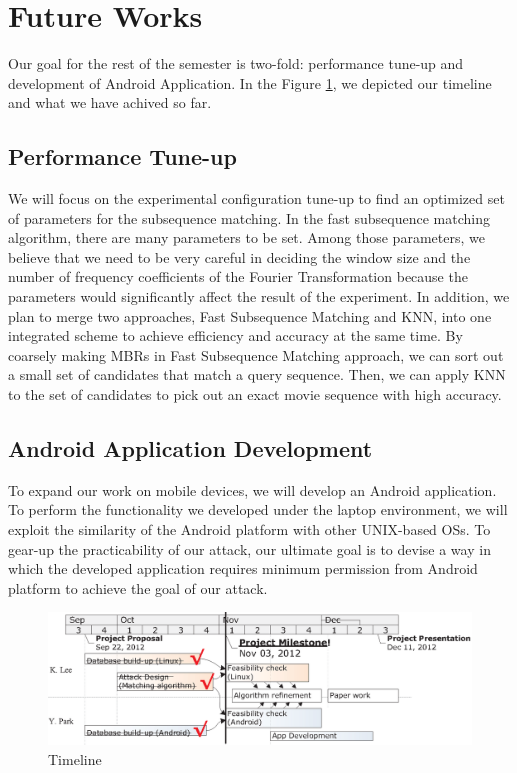\section{Future Works}
\label{sec:future}
Our goal for the rest of the semester is two-fold: performance tune-up and development of Android Application. In the Figure \ref{fig:timeline}, we depicted our timeline and what we have achived so far.
\subsection{Performance Tune-up}
We will focus on the experimental configuration tune-up to find an optimized set of parameters for the subsequence matching. In the fast subsequence matching algorithm, there are many parameters to be set. Among those parameters, we believe that we need to be very careful in deciding the window size and the number of frequency coefficients of the Fourier Transformation because the parameters would significantly affect the result of the experiment.
In addition, we plan to merge two approaches, Fast Subsequence Matching and KNN, into one integrated scheme to achieve efficiency and accuracy at the same time. By coarsely making MBRs in Fast Subsequence Matching approach, we can sort out a small set of candidates that match a query sequence. Then, we can apply KNN to the set of candidates to pick out an exact movie sequence with high accuracy.
\subsection{Android Application Development}
To expand our work on mobile devices, we will develop an Android application. To perform the functionality we developed under the laptop environment, we will exploit the similarity of the Android platform with other UNIX-based OSs. To gear-up the practicability of our attack, our ultimate goal is to devise a way in which the developed application requires minimum permission from Android platform to achieve the goal of our attack.
\begin{figure}[!hb]
\centering
\includegraphics{Figures/Timeline_Mile}
\caption{Timeline}
\label{fig:timeline}
\vspace{-5mm}
\end{figure}